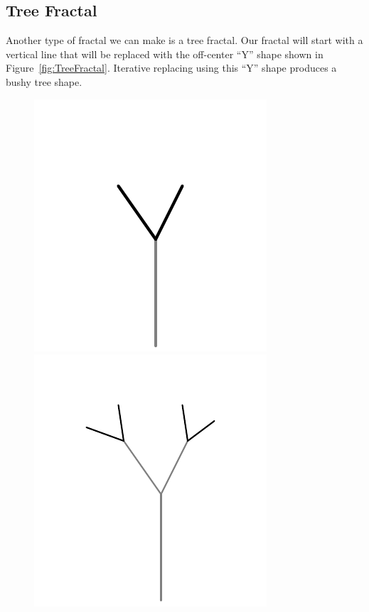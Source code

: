 \subsection{Tree Fractal}

Another type of fractal we can make is a tree fractal.
Our fractal will start with a vertical line that will be replaced with the off-center ``Y'' shape shown in Figure~\ref{fig:TreeFractal}.
Iterative replacing using this ``Y'' shape produces a bushy tree shape.

\begin{figure}[htb]
  \centering
  \includegraphics[scale=1]{images/Tree01}
  \includegraphics[scale=1]{images/Tree02}

\end{figure}
